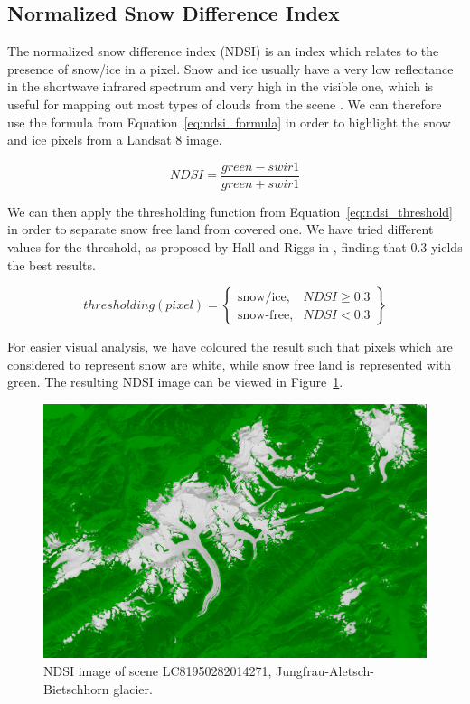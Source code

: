 \documentclass[12pt, a4paper]{report}
\begin{document}
	
	\subsection{Normalized Snow Difference Index}
	\label{seq:ndsi_functional}
	
	\par The normalized snow difference index (NDSI) is an index which relates to the presence of snow/ice in a pixel. Snow and ice usually have a very low reflectance in the shortwave infrared spectrum and very high in the visible one, which is useful for mapping out most types of clouds from the scene \cite{ndsi}. We can therefore use the formula from Equation~\ref{eq:ndsi_formula} in order to highlight the snow and ice pixels from a Landsat 8 image.
	
	\begin{equation}\label{eq:ndsi_formula}
		NDSI = \frac{green - swir1}{green + swir1}
	\end{equation}

	\par We can then apply the thresholding function from Equation~\ref{eq:ndsi_threshold} in order to separate snow free land from covered one. We have tried different values for the threshold, as proposed by Hall and Riggs in \cite{Hall2001}, finding that 0.3 yields the best results.
	
	\begin{equation}
		thresholding(pixel) = \left.
		\begin{cases}\label{eq:ndsi_threshold}
			\text{snow/ice},  & NDSI \geq 0.3\\
			\text{snow-free}, & NDSI < 0.3
		\end{cases}
		\right\}
	\end{equation}

	\par For easier visual analysis, we have coloured the result such that pixels which are considered to represent snow are white, while snow free land is represented with green. The resulting NDSI image can be viewed in Figure~\ref{fig:ndsi}.
	
	\begin{figure}[h!]
		\centering
		\includegraphics[width=\columnwidth]{../images/LC81950282014271_ndsi.png}
		\caption{NDSI image of scene LC81950282014271, Jungfrau-Aletsch-Bietschhorn glacier.}
		\label{fig:ndsi}
	\end{figure}
\end{document}
